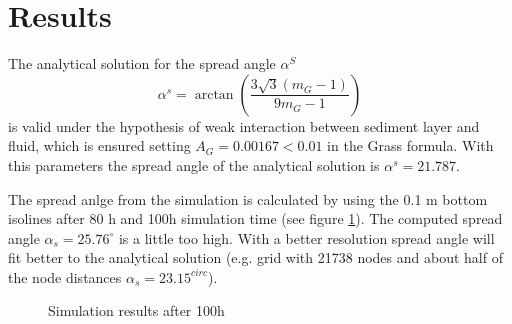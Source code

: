 %
\section{Results}
%
The analytical solution for the spread angle $\alpha^S$
\begin{equation}
\alpha^s = \arctan (\frac{3\sqrt{3}(m_G-1)}{9m_G-1})
\end{equation}
is valid under the hypothesis of weak interaction between sediment layer
and fluid, which is ensured setting $A_G=0.00167 < 0.01$ in the Grass formula.
With this parameters the spread angle of the analytical solution is $\alpha^s=21.787$.

The spread anlge from the simulation is calculated by using the
0.1 m  bottom isolines after 80 h and 100h simulation time (see figure \ref{gai_bump-t2d}).
The computed spread angle $\alpha_s=25.76^{\circ}$ is a little too high. With a better resolution
spread angle will fit better to the analytical solution
(e.g. grid with 21738 nodes and about half of the node distances $\alpha_s=23.15^{circ}$).


\begin{figure} [!ht]
\centering
 \caption{Simulation results after 100h}\label{gai_bump-t2d}
\end{figure}


